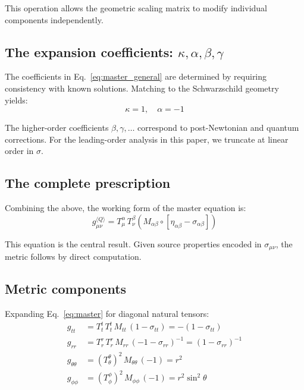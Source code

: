 \documentclass[11pt,a4paper]{article}
\theoremstyle{definition}
\theoremstyle{remark}
\begin{document}
	This operation allows the geometric scaling matrix to modify individual components independently.
	
	\subsection{The expansion coefficients: $\kappa, \alpha, \beta, \gamma$}
	
	The coefficients in Eq.~\eqref{eq:master_general} are determined by requiring consistency with known solutions. Matching to the Schwarzschild geometry yields:
	\begin{equation}
		\kappa = 1, \quad \alpha = -1
		\label{eq:coefficients}
	\end{equation}
	
	The higher-order coefficients $\beta, \gamma, \ldots$ correspond to post-Newtonian and quantum corrections. For the leading-order analysis in this paper, we truncate at linear order in $\sigma$.
	
	\subsection{The complete prescription}
	
	Combining the above, the working form of the master equation is:
	\begin{equation}
		g_{\mu\nu}^{\langle Q \rangle} = T^\alpha_\mu \, T^\beta_\nu \left( M_{\alpha\beta} \circ \left[\eta_{\alpha\beta} - \sigma_{\alpha\beta} \right] \right)
		\label{eq:master}
	\end{equation}
	
	This equation is the central result. Given source properties encoded in $\sigma_{\mu\nu}$, the metric follows by direct computation.
	
	\subsection{Metric components}
	
	Expanding Eq.~\eqref{eq:master} for diagonal natural tensors:
	\begin{align}
		g_{tt} &= T^t_t \, T^t_t \, M_{tt} \, (1 - \sigma_{tt}) = -(1 - \sigma_{tt}) \label{eq:gtt} \\
		g_{rr} &= T^r_r \, T^r_r \, M_{rr} \, (-1 - \sigma_{rr})^{-1} = (1 - \sigma_{rr})^{-1} \label{eq:grr} \\
		g_{\theta\theta} &= (T^\theta_\theta)^2 \, M_{\theta\theta} \, (-1) = r^2 \label{eq:gtheta} \\
		g_{\phi\phi} &= (T^\phi_\phi)^2 \, M_{\phi\phi} \, (-1) = r^2\sin^2\theta \label{eq:gphi}
	\end{align}
	
\end{document}
